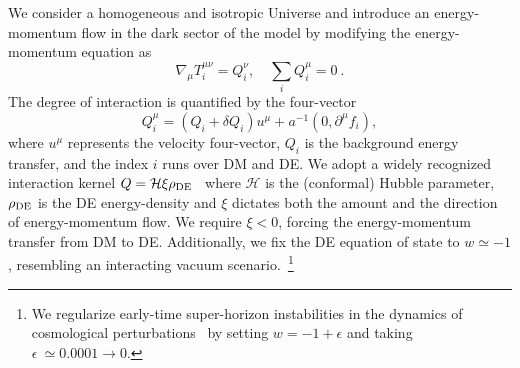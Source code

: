 \documentclass[superscriptaddress,twocolumn,showpacs,a4paper,
amssymb,amsmath,nobibnotes,aps,prl,
showkeys,
nofootinbib,notitlepage]{revtex4-1}
\begin{document}
\bigskip

We consider a homogeneous and isotropic Universe and introduce an energy-momentum flow in the dark sector of the model by modifying the energy-momentum equation as
\begin{equation}
\label{DE_DM_1}
\nabla_{\mu}T_{i}^{\mu \nu }=Q_{i}^{\nu}, \quad \sum\limits_{i}{Q_{i}^{\mu }}=0~.
\end{equation}
The degree of interaction is quantified by the four-vector
\begin{equation}
Q_{i}^{\mu}=(Q_{i}+\delta Q_{i})u^{\mu}+a^{-1}(0,\partial^{\mu}f_{i}),
\end{equation}
where $u^{\mu}$ represents the velocity four-vector, $Q_i$ is the background energy transfer, and the index $i$ runs over DM and DE. We adopt a widely recognized interaction kernel $Q = \mathcal{H} \xi \rho_{\rm DE}$~\cite{Gavela:2010tm,DiValentino:2019jae,Zhai:2023yny,silva2024nonlinear,DiValentino:2019ffd} where $\mathcal{H}$ is the (conformal) Hubble parameter, $\rho_{\rm DE}$ is the DE energy-density and $\xi$ dictates both the amount and the direction of energy-momentum flow. We require $\xi < 0$, forcing the energy-momentum transfer from DM to DE. Additionally, we fix the DE equation of state to $w\simeq-1$, resembling an interacting vacuum scenario.~\footnote{We regularize early-time super-horizon instabilities in the dynamics of cosmological perturbations~\cite{Valiviita:2008iv,Gavela:2010tm} by setting $w=-1+\epsilon$ and taking $\epsilon~\simeq 0.0001 \to0$.}
\end{document}

